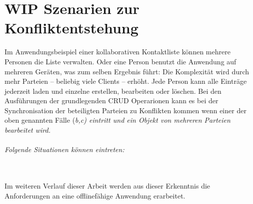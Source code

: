 \section{\label{sec:konfliktszenarien}WIP Szenarien zur Konfliktentstehung}
Im Anwendungsbeispiel einer kollaborativen Kontaktliste können mehrere Personen die Liste verwalten. Oder eine Person benutzt die Anwendung auf mehreren Geräten, was zum selben Ergebnis führt:
Die Komplexität wird durch mehr Parteien -- beliebig viele Clients -- erhöht.
Jede Person kann alle Einträge jederzeit laden und einzelne erstellen, bearbeiten oder löschen. Bei den Ausführungen der grundlegenden \gls{CRUD} Operarionen kann es bei der Synchronisation der beteiligten Parteien zu Konflikten kommen wenn einer der oben genannten Fälle (\it{b,c}) eintritt und ein Objekt von mehreren Parteien bearbeitet wird.\\
\\
Folgende Situationen können eintreten:

%
\\\\
Im weiteren Verlauf dieser Arbeit werden aus dieser Erkenntnis die Anforderungen an eine offlinefähige Anwendung erarbeitet.